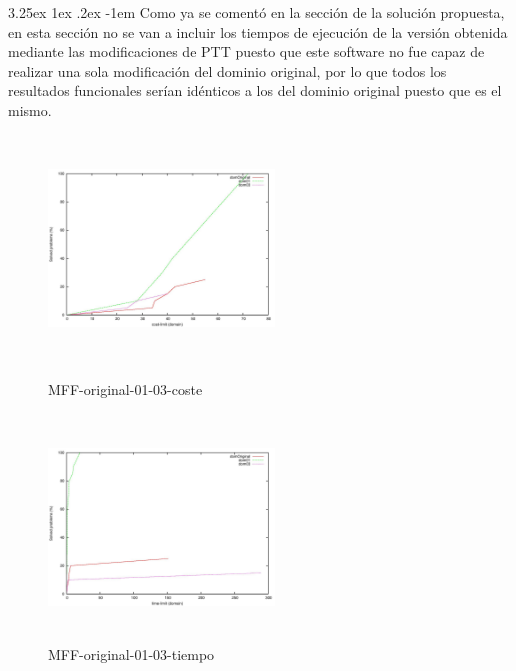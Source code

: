 \documentclass{article}
\makeatletter
\renewcommand\paragraph{\@startsection{paragraph}{5}{\z@}%
  {3.25ex \@plus1ex \@minus.2ex}%
  {-1em}%
  {\normalfont\normalsize\bfseries}}
\makeatother
\begin{document}
\paragraph{}
Como ya se comentó en la sección de la solución propuesta, en esta sección no se van a incluir los tiempos de ejecución de la versión obtenida mediante las modificaciones de PTT puesto que este software no fue capaz de realizar una sola modificación del dominio original, por lo que todos los resultados funcionales serían idénticos a los del dominio original puesto que es el mismo.

\pagebreak

\begin{figure}[!htb]
   \begin{minipage}{0.48\textwidth}
     \centering
     \includegraphics[width=6cm, height=6cm]{mff-or-01-03-cost}
    \caption{MFF-original-01-03-coste}
   \end{minipage}\hfill
   \begin {minipage}{0.48\textwidth}
     \centering
     \includegraphics[width=6cm, height=6cm]{mff-or-01-03-time}
    \caption{MFF-original-01-03-tiempo}
   \end{minipage}
\end{figure}
\end{document}
